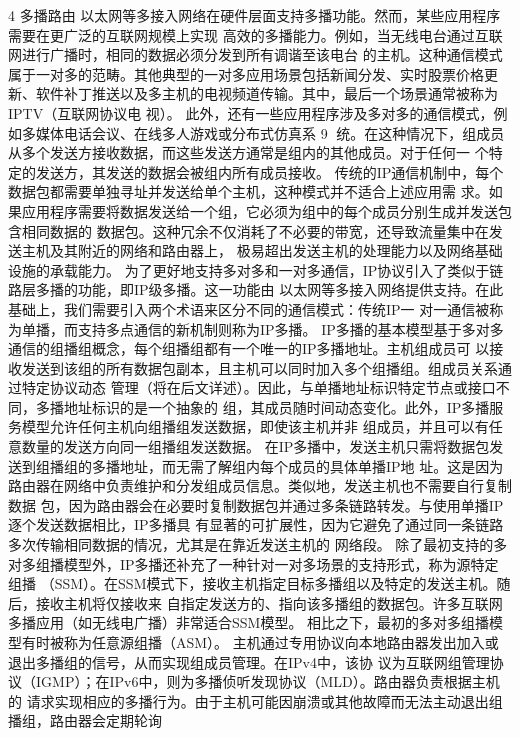 4 多播路由
以太网等多接入网络在硬件层面支持多播功能。然而，某些应用程序需要在更广泛的互联网规模上实现
高效的多播能力。例如，当无线电台通过互联网进行广播时，相同的数据必须分发到所有调谐至该电台
的主机。这种通信模式属于一对多的范畴。其他典型的一对多应用场景包括新闻分发、实时股票价格更
新、软件补丁推送以及多主机的电视频道传输。其中，最后一个场景通常被称为IPTV（互联网协议电
视）。
此外，还有一些应用程序涉及多对多的通信模式，例如多媒体电话会议、在线多人游戏或分布式仿真系
                                                      9
统。在这种情况下，组成员从多个发送方接收数据，而这些发送方通常是组内的其他成员。对于任何一
个特定的发送方，其发送的数据会被组内所有成员接收。
传统的IP通信机制中，每个数据包都需要单独寻址并发送给单个主机，这种模式并不适合上述应用需
求。如果应用程序需要将数据发送给一个组，它必须为组中的每个成员分别生成并发送包含相同数据的
数据包。这种冗余不仅消耗了不必要的带宽，还导致流量集中在发送主机及其附近的网络和路由器上，
极易超出发送主机的处理能力以及网络基础设施的承载能力。
为了更好地支持多对多和一对多通信，IP协议引入了类似于链路层多播的功能，即IP级多播。这一功能由
以太网等多接入网络提供支持。在此基础上，我们需要引入两个术语来区分不同的通信模式：传统IP一
对一通信被称为单播，而支持多点通信的新机制则称为IP多播。
IP多播的基本模型基于多对多通信的组播组概念，每个组播组都有一个唯一的IP多播地址。主机组成员可
以接收发送到该组的所有数据包副本，且主机可以同时加入多个组播组。组成员关系通过特定协议动态
管理（将在后文详述）。因此，与单播地址标识特定节点或接口不同，多播地址标识的是一个抽象的
组，其成员随时间动态变化。此外，IP多播服务模型允许任何主机向组播组发送数据，即使该主机并非
组成员，并且可以有任意数量的发送方向同一组播组发送数据。
在IP多播中，发送主机只需将数据包发送到组播组的多播地址，而无需了解组内每个成员的具体单播IP地
址。这是因为路由器在网络中负责维护和分发组成员信息。类似地，发送主机也不需要自行复制数据
包，因为路由器会在必要时复制数据包并通过多条链路转发。与使用单播IP逐个发送数据相比，IP多播具
有显著的可扩展性，因为它避免了通过同一条链路多次传输相同数据的情况，尤其是在靠近发送主机的
网络段。
除了最初支持的多对多组播模型外，IP多播还补充了一种针对一对多场景的支持形式，称为源特定组播
（SSM）。在SSM模式下，接收主机指定目标多播组以及特定的发送主机。随后，接收主机将仅接收来
自指定发送方的、指向该多播组的数据包。许多互联网多播应用（如无线电广播）非常适合SSM模型。
相比之下，最初的多对多组播模型有时被称为任意源组播（ASM）。
主机通过专用协议向本地路由器发出加入或退出多播组的信号，从而实现组成员管理。在IPv4中，该协
议为互联网组管理协议（IGMP）；在IPv6中，则为多播侦听发现协议（MLD）。路由器负责根据主机的
请求实现相应的多播行为。由于主机可能因崩溃或其他故障而无法主动退出组播组，路由器会定期轮询
